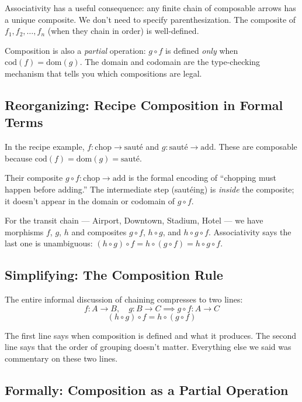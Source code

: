 Associativity has a useful consequence: any finite chain of composable arrows
has a unique composite. We don't need to specify parenthesization. The
composite of $f_1, f_2, \ldots, f_n$ (when they chain in order) is
well-defined.

Composition is also a \emph{partial} operation: $g \circ f$ is defined
\emph{only} when $\mathrm{cod}(f) = \mathrm{dom}(g)$. The domain and codomain
are the type-checking mechanism that tells you which compositions are legal.

\subsection{Reorganizing: Recipe Composition in Formal Terms}

In the recipe example, $f : \text{chop} \to \text{sauté}$ and
$g : \text{sauté} \to \text{add}$. These are composable because
$\mathrm{cod}(f) = \mathrm{dom}(g) = \text{sauté}$.

Their composite $g \circ f : \text{chop} \to \text{add}$ is the formal
encoding of ``chopping must happen before adding.'' The intermediate step
(sautéing) is \emph{inside} the composite; it doesn't appear in the domain
or codomain of $g \circ f$.

For the transit chain --- Airport, Downtown, Stadium, Hotel --- we have
morphisms $f$, $g$, $h$ and composites $g \circ f$, $h \circ g$, and
$h \circ g \circ f$. Associativity says the last one is unambiguous:
$(h \circ g) \circ f = h \circ (g \circ f) = h \circ g \circ f$.

\subsection{Simplifying: The Composition Rule}

The entire informal discussion of chaining compresses to two lines:
\[
  f : A \to B,\quad g : B \to C \implies g \circ f : A \to C
\]
\[
  (h \circ g) \circ f = h \circ (g \circ f)
\]

The first line says when composition is defined and what it produces. The
second line says that the order of grouping doesn't matter. Everything else
we said was commentary on these two lines.

\subsection{Formally: Composition as a Partial Operation}

